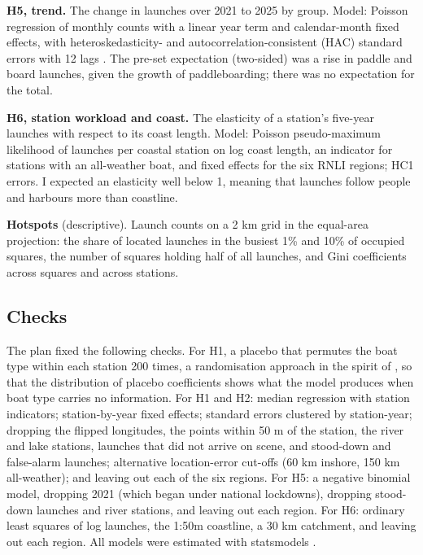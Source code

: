 \documentclass[11pt,a4paper]{article}
\begin{document}
\textbf{H5, trend.} The change in launches over 2021 to 2025 by group. Model: Poisson regression of monthly counts with a linear year term and calendar-month fixed effects, with heteroskedasticity- and autocorrelation-consistent (HAC) standard errors with 12 lags \citep{newey1987}. The pre-set expectation (two-sided) was a rise in paddle and board launches, given the growth of paddleboarding; there was no expectation for the total.

\textbf{H6, station workload and coast.} The elasticity of a station's five-year launches with respect to its coast length. Model: Poisson pseudo-maximum likelihood \citep{santos2006} of launches per coastal station on log coast length, an indicator for stations with an all-weather boat, and fixed effects for the six RNLI regions; HC1 errors. I expected an elasticity well below 1, meaning that launches follow people and harbours more than coastline.

\textbf{Hotspots} (descriptive). Launch counts on a 2 km grid in the equal-area projection: the share of located launches in the busiest 1\% and 10\% of occupied squares, the number of squares holding half of all launches, and Gini coefficients across squares and across stations.

\subsection{Checks}
The plan fixed the following checks. For H1, a placebo that permutes the boat type within each station 200 times, a randomisation approach in the spirit of \citet{young2019}, so that the distribution of placebo coefficients shows what the model produces when boat type carries no information. For H1 and H2: median regression \citep{koenker1978} with station indicators; station-by-year fixed effects; standard errors clustered by station-year; dropping the flipped longitudes, the points within 50 m of the station, the river and lake stations, launches that did not arrive on scene, and stood-down and false-alarm launches; alternative location-error cut-offs (60 km inshore, 150 km all-weather); and leaving out each of the six regions. For H5: a negative binomial model, dropping 2021 (which began under national lockdowns), dropping stood-down launches and river stations, and leaving out each region. For H6: ordinary least squares of log launches, the 1:50m coastline, a 30 km catchment, and leaving out each region. All models were estimated with statsmodels \citep{seabold2010}.
\end{document}
